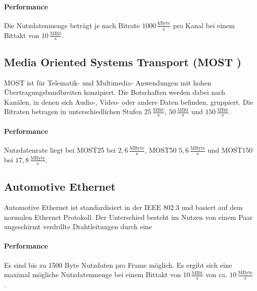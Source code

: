 \paragraph{Performance}
Die Nutzdatenmenge beträgt je nach Bitrate $ 1000\,\frac{\mathrm{kByte}}{\mathrm{s}} $ pro Kanal bei einem Bittakt von $ 10\,\frac{\mathrm{MBit}}{\mathrm{s}} $. \cite[Vgl. Seite 118 f.]{Zimmermann.2014}
\subsection{Media Oriented Systems Transport (MOST )}
MOST ist für Telematik- und Multimedia- Anwendungen mit hohen Übertragungsbandbreiten konzipiert.
Die Botschaften werden dabei nach Kanälen, in denen sich Audio-, Video- oder andere Daten befinden, gruppiert.
Die Bitraten betragen in unterschiedlichen Stufen $ 25\,\frac{\mathrm{MBit}}{\mathrm{s}} $, $ 50\,\frac{\mathrm{MBit}}{\mathrm{s}} $ und $ 150\,\frac{\mathrm{MBit}}{\mathrm{s}} $.
\paragraph{Performance}
Nutzdatenrate liegt bei MOST25 bei $ 2,6\,\frac{\mathrm{MByte}}{\mathrm{s}} $, MOST50 $ 5,6\,\frac{\mathrm{MByte}}{\mathrm{s}} $  und MOST150 bei $ 17,8\,\frac{\mathrm{MByte}}{\mathrm{s}} $.
\cite[Vgl. Seite 119 ff.]{Zimmermann.2014}
\subsection{Automotive Ethernet}
Automotive Ethernet ist standardisiert in der IEEE 802.3 und basiert auf dem normalen Ethernet Protokoll. Der Unterschied besteht im Nutzen von einem Paar ungeschirmt verdrillte Drahtleitungen durch eine
\paragraph{Performance}
Es sind bis zu 1500 Byte Nutzdaten pro Frame möglich. Es ergibt sich eine maximal mögliche Nutzdatenmenge bei einem Bittakt von $ 10\,\frac{\mathrm{MBit}}{\mathrm{s}} $ von ca. $ 10\,\frac{\mathrm{MByte}}{\mathrm{s}} $. \cite[Vgl. Seite 138 ff.]{Zimmermann.2014}
